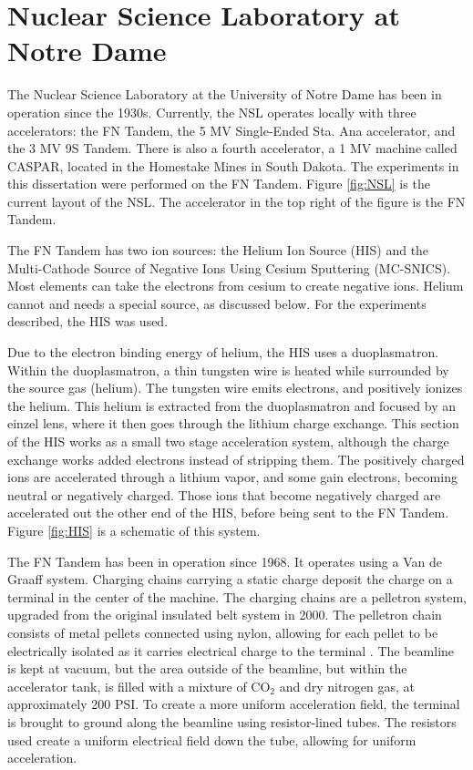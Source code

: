 \section{Nuclear Science Laboratory at Notre Dame}

The Nuclear Science Laboratory at the University of Notre Dame has been in operation since the 1930s. Currently, the NSL operates locally with three accelerators: the FN Tandem, the 5 MV Single-Ended Sta. Ana accelerator, and the 3 MV 9S Tandem. There is also a fourth accelerator, a 1 MV machine called CASPAR, located in the Homestake Mines in South Dakota. The experiments in this dissertation were performed on the FN Tandem. Figure \ref{fig:NSL} is the current layout of the NSL. The accelerator in the top right of the figure is the FN Tandem.

The FN Tandem has two ion sources: the Helium Ion Source (HIS) and the Multi-Cathode Source of Negative Ions Using Cesium Sputtering (MC-SNICS). Most elements can take the electrons from cesium to create negative ions. Helium cannot and needs a special source, as discussed below. For the experiments described, the HIS was used.

Due to the electron binding energy of helium, the HIS uses a duoplasmatron. Within the duoplasmatron, a thin tungsten wire is heated while surrounded by the source gas (helium). The tungsten wire emits electrons, and positively ionizes the helium. This helium is extracted from the duoplasmatron and focused by an einzel lens, where it then goes through the lithium charge exchange. This section of the HIS works as a small two stage acceleration system, although the charge exchange works added electrons instead of stripping them. The positively charged ions are accelerated through a lithium vapor, and some gain electrons, becoming neutral or negatively charged. Those ions that become negatively charged are accelerated out the other end of the HIS, before being sent to the FN Tandem. Figure \ref{fig:HIS} is a schematic of this system.



The FN Tandem has been in operation since 1968. It operates using a Van de Graaff system. Charging chains carrying a static charge deposit the charge on a terminal in the center of the machine. The charging chains are a pelletron system, upgraded from the original insulated belt system in 2000. The pelletron chain consists of metal pellets connected using nylon, allowing for each pellet to be electrically isolated as it carries electrical charge to the terminal \citep{nec:_pelletron}. The beamline is kept at vacuum, but the area outside of the beamline, but within the accelerator tank, is filled with a mixture of CO$_2$ and dry nitrogen gas, at approximately 200 PSI. To create a more uniform acceleration field, the terminal is brought to ground along the beamline using resistor-lined tubes. The resistors used create a uniform electrical field down the tube, allowing for uniform acceleration.

